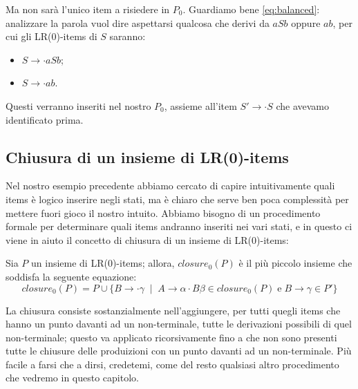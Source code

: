 \documentclass[class=book, crop=false, oneside, 12pt]{standalone}
\begin{document}
Ma non sarà l'unico item a risiedere in \(P_0\).  Guardiamo bene \ref{eq:balanced}: analizzare la parola vuol dire aspettarsi qualcosa che derivi da \(aSb\) oppure \(ab\), per cui gli LR(0)-items di \(S\) saranno:
\begin{itemize}
    \item \(S \to \cdot aSb\);
    \item \(S \to \cdot ab\).
\end{itemize}
Questi verranno inseriti nel nostro \(P_0\), assieme all'item \(S' \to \cdot S\) che avevamo identificato prima. 

\subsection{Chiusura di un insieme di LR(0)-items}
Nel nostro esempio precedente abbiamo cercato di capire intuitivamente quali items è logico inserire negli stati, ma è chiaro che serve ben poca complessità per mettere fuori gioco il nostro intuito. Abbiamo bisogno di un procedimento formale per determinare quali items andranno inseriti nei vari stati, e in questo ci viene in aiuto il concetto di chiusura di un insieme di LR(0)-items:

\begin{definition}
    Sia \(P\) un insieme di LR(0)-items; allora, \(closure_0(P)\) è il più piccolo insieme che soddisfa la seguente equazione:
    \begin{equation}
        closure_0(P) = P \cup \{B \to \cdot \gamma \; \mid \; A \to \alpha \cdot B \beta \in closure_0(P) \; \textrm{e} \; B \to \gamma \in P'\}
    \end{equation}
\end{definition}

La chiusura consiste sostanzialmente nell'aggiungere, per tutti quegli items che hanno un punto davanti ad un non-terminale, tutte le derivazioni possibili di quel non-terminale; questo va applicato ricorsivamente fino a che non sono presenti tutte le chiusure delle produizioni con un punto davanti ad un non-terminale. Più facile a farsi che a dirsi, credetemi, come del resto qualsiasi altro procedimento che vedremo in questo capitolo.
\end{document}
